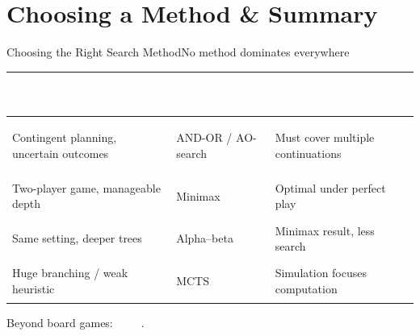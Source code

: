 \documentclass[aspectratio=169,11pt]{beamer}
\begin{document}
\section{Choosing a Method \& Summary}

\begin{frame}{Choosing the Right Search Method}{No method dominates everywhere}
  \small
  \renewcommand{\arraystretch}{1.35}
  \begin{center}
  \begin{tabularx}{\textwidth}{@{}>{\raggedright\arraybackslash}p{4.3cm} >{\bfseries\raggedright\arraybackslash}p{3.2cm} >{\raggedright\arraybackslash}X@{}}
    \toprule
    \rowcolor{PrimaryDark}
    \textcolor{white}{Situation} & \textcolor{white}{Method} & \textcolor{white}{Reason} \\
    \midrule
    Contingent planning, uncertain outcomes & AND-OR / AO-search & Must cover multiple continuations \\
    \rowcolor{PrimaryLight!25}
    Two-player game, manageable depth & Minimax & Optimal under perfect play \\
    Same setting, deeper trees & Alpha--beta & Minimax result, less search \\
    \rowcolor{PrimaryLight!25}
    Huge branching / weak heuristic & MCTS & Simulation focuses computation \\
    \bottomrule
  \end{tabularx}
  \end{center}
  \begin{center}\scriptsize
    Beyond board games:  \textbullet\ 
    \textbullet\  \textbullet\ .
  \end{center}
\end{frame}
\end{document}
